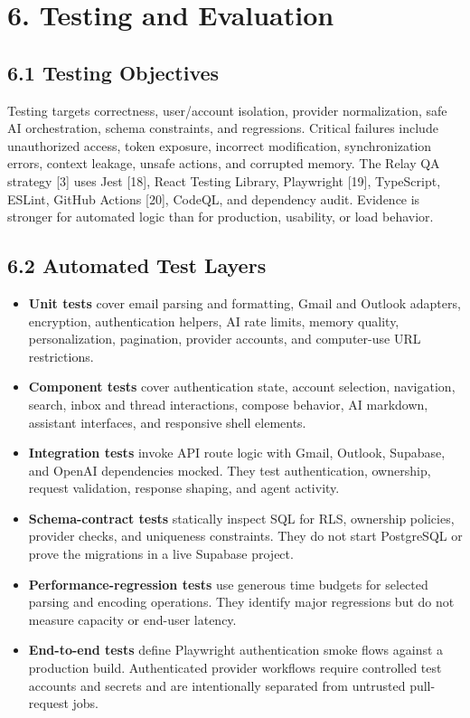 \documentclass[
]{report}
\providecommand{\tightlist}{%
  \setlength{\itemsep}{0pt}\setlength{\parskip}{0pt}}
\begin{document}
\chapter{6. Testing and Evaluation}\label{6-testing-and-evaluation}

\section{6.1 Testing Objectives}\label{61-testing-objectives}

Testing targets correctness, user/account isolation, provider
normalization, safe AI orchestration, schema constraints, and
regressions. Critical failures include unauthorized access, token
exposure, incorrect modification, synchronization errors, context
leakage, unsafe actions, and corrupted memory. The Relay QA strategy
{[}3{]} uses Jest {[}18{]}, React Testing Library, Playwright {[}19{]},
TypeScript, ESLint, GitHub Actions {[}20{]}, CodeQL, and dependency
audit. Evidence is stronger for automated logic than for production,
usability, or load behavior.

\section{6.2 Automated Test Layers}\label{62-automated-test-layers}

\begin{itemize}
\tightlist
\item
  \textbf{Unit tests} cover email parsing and formatting, Gmail and
  Outlook adapters, encryption, authentication helpers, AI rate limits,
  memory quality, personalization, pagination, provider accounts, and
  computer-use URL restrictions.
\item
  \textbf{Component tests} cover authentication state, account
  selection, navigation, search, inbox and thread interactions, compose
  behavior, AI markdown, assistant interfaces, and responsive shell
  elements.
\item
  \textbf{Integration tests} invoke API route logic with Gmail, Outlook,
  Supabase, and OpenAI dependencies mocked. They test authentication,
  ownership, request validation, response shaping, and agent activity.
\item
  \textbf{Schema-contract tests} statically inspect SQL for RLS,
  ownership policies, provider checks, and uniqueness constraints. They
  do not start PostgreSQL or prove the migrations in a live Supabase
  project.
\item
  \textbf{Performance-regression tests} use generous time budgets for
  selected parsing and encoding operations. They identify major
  regressions but do not measure capacity or end-user latency.
\item
  \textbf{End-to-end tests} define Playwright authentication smoke flows
  against a production build. Authenticated provider workflows require
  controlled test accounts and secrets and are intentionally separated
  from untrusted pull-request jobs.
\end{itemize}
\end{document}
